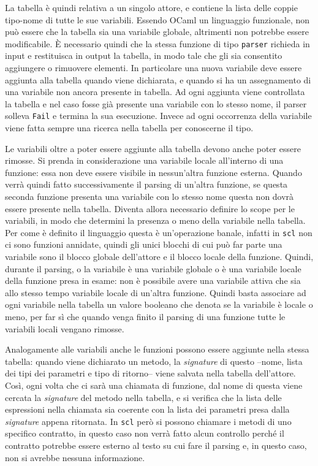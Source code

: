 \documentclass[12pt,a4paper]{report}
\begin{document}
La tabella è quindi relativa a un singolo attore, e contiene la lista
delle coppie tipo-nome di tutte le sue variabili. Essendo OCaml un
linguaggio funzionale, non può essere che la tabella sia una variabile
globale, altrimenti non potrebbe essere modificabile. È necessario
quindi che la stessa funzione di tipo \texttt{parser} richieda in input
e restituisca in output la tabella, in modo tale che gli sia consentito
aggiungere o rimuovere elementi. In particolare una nuova variabile deve
essere aggiunta alla tabella quando viene dichiarata, e quando si ha un
assegnamento di una variabile non ancora presente in tabella. Ad ogni
aggiunta viene controllata la tabella e nel caso fosse già presente una
variabile con lo stesso nome, il parser solleva \texttt{Fail} e termina
la sua esecuzione. Invece ad ogni occorrenza della variabile viene fatta
sempre una ricerca nella tabella per conoscerne il tipo.

Le variabili oltre a poter essere aggiunte alla tabella devono anche
poter essere rimosse. Si prenda in considerazione una variabile locale
all'interno di una funzione: essa non deve essere visibile in
nessun'altra funzione esterna. Quando verrà quindi fatto successivamente
il parsing di un'altra funzione, se questa seconda funzione presenta una
variabile con lo stesso nome questa non dovrà essere presente nella
tabella. Diventa allora necessario definire lo scope per le variabili,
in modo che determini la presenza o meno della variabile nella tabella.
Per come è definito il linguaggio questa è un'operazione banale, infatti
in \texttt{scl} non ci sono funzioni annidate, quindi gli unici blocchi
di cui può far parte una variabile sono il blocco globale dell'attore e
il blocco locale della funzione. Quindi, durante il parsing, o la
variabile è una variabile globale o è una variabile locale della
funzione presa in esame: non è possibile avere una variabile attiva che
sia allo stesso tempo variabile locale di un'altra funzione. Quindi
basta associare ad ogni variabile nella tabella un valore booleano che
denota se la variabile è locale o meno, per far sì che quando venga
finito il parsing di una funzione tutte le variabili locali vengano
rimosse.

Analogamente alle variabili anche le funzioni possono essere aggiunte
nella stessa tabella: quando viene dichiarato un metodo, la
\emph{signature} di questo --nome, lista dei tipi dei parametri e tipo
di ritorno-- viene salvata nella tabella dell'attore. Così, ogni volta
che ci sarà una chiamata di funzione, dal nome di questa viene cercata
la \emph{signature} del metodo nella tabella, e si verifica che la lista
delle espressioni nella chiamata sia coerente con la lista dei parametri
presa dalla \emph{signature} appena ritornata. In \texttt{scl} però si
possono chiamare i metodi di uno specifico contratto, in questo caso non
verrà fatto alcun controllo perché il contratto potrebbe essere esterno
al testo su cui fare il parsing e, in questo caso, non si avrebbe
nessuna informazione.
\end{document}

